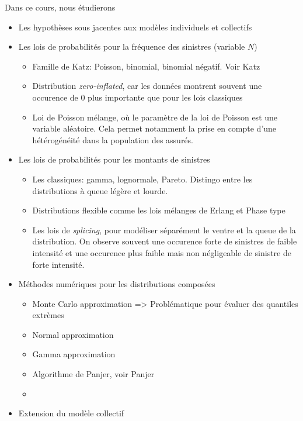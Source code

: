 \documentclass[8pt,notheorems]{beamer}
\theoremstyle{definition}
\theoremstyle{example}
\theoremstyle{mystyle}
\theoremstyle{plain}
\begin{document}
\begin{frame}[allowframebreaks]
Dans ce cours, nous étudierons
\begin{itemize}
    \item Les hypothèses sous jacentes aux modèles individuels et collectifs
    \item Les lois de probabilités pour la fréquence des sinistres (variable $N$)
    \begin{itemize}
        \item Famille de Katz: Poisson, binomial, binomial négatif. Voir Katz \cite{Ka65}
        \item Distribution \textit{zero-inflated}, car les données montrent souvent une occurence de $0$ plus importante que pour les lois classiques 
        \item Loi de Poisson mélange, où le paramètre de la loi de Poisson est une variable aléatoire. Cela permet notamment la prise en compte d'une hétérogénéité dans la population des assurés. 
    \end{itemize}
    \item Les lois de probabilités pour les montants de sinistres 
    \begin{itemize}
        \item Les classiques: gamma, lognormale, Pareto. Distingo entre les distributions à queue légère et lourde. 
        \item Distributions flexible comme les lois mélanges de Erlang et Phase type
        \item Les lois de \textit{splicing}, pour modéliser séparément le ventre et la queue de la distribution. On observe souvent une occurence forte de sinistres de faible intensité et une occurence plus faible mais non négligeable de sinistre de forte intensité.  
    \end{itemize}
    \item Méthodes numériques pour les distributions composées
    \begin{itemize}
        \item Monte Carlo approximation => Problématique pour évaluer des quantiles extrèmes
        \item Normal approximation
        \item Gamma approximation
        \item Algorithme de Panjer, voir Panjer \cite{Pa81}
        \item {}
    \end{itemize}
    \item Extension du modèle collectif
    \begin{itemize}

\end{itemize}
\end{itemize}
\end{frame}
\end{document}
